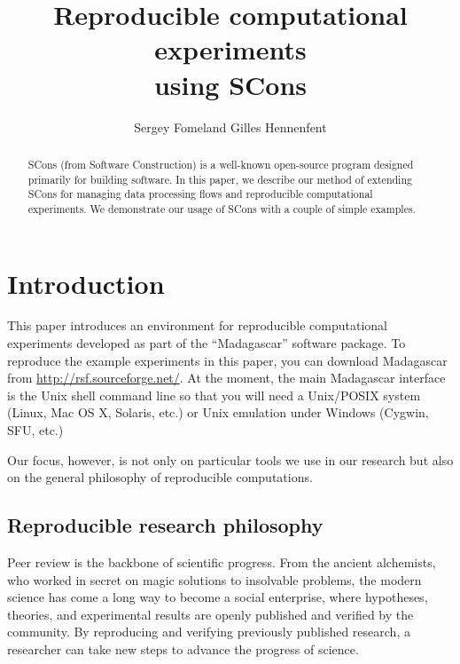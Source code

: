 \title{Reproducible computational experiments \\ using SCons}


\author{Sergey Fomel\/\footnotemark[1] and Gilles Hennenfent\/\footnotemark[2]}


\maketitle

\begin{abstract}
  SCons (from Software Construction) is a well-known open-source
  program designed primarily for building software. In this paper, we
  describe our method of extending SCons for managing data processing
  flows and reproducible computational experiments. We demonstrate our
  usage of SCons with a couple of simple examples.
\end{abstract}

\section{Introduction}

This paper introduces an environment for reproducible computational
experiments developed as part of the ``Madagascar'' software package.
To reproduce the example experiments in this paper, you can download
Madagascar from \url{http://rsf.sourceforge.net/}. At the moment, the
main Madagascar interface is the Unix shell command line so that you
will need a Unix/POSIX system (Linux, Mac OS X, Solaris, etc.) or Unix
emulation under Windows (Cygwin, SFU, etc.)

Our focus, however, is not only on particular
tools we use in our research but also on the general philosophy of
reproducible computations.

\subsection{Reproducible research philosophy}

Peer review is the backbone of scientific progress. From the ancient
alchemists, who worked in secret on magic solutions to insolvable
problems, the modern science has come a long way to become a social
enterprise, where hypotheses, theories, and experimental results are
openly published and verified by the community. By reproducing and
verifying previously published research, a researcher can take new
steps to advance the progress of science.

